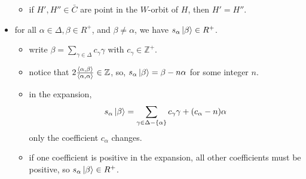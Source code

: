 \begin{itemize}
\begin{tcolorbox}[title=proof:]
\begin{itemize}
			\item if $H', H'' \in \bar{C}$ are point in the $W$-orbit of $H$, then $H' = H''$.
		\end{itemize}
	\end{tcolorbox}
	
	\item for all $\alpha \in \Delta, \beta \in R^+$, and $\beta \neq \alpha$, we have $s_\alpha \ket{\beta} \in R^+$.
	
	\begin{tcolorbox}[title=proof:]
		\begin{itemize}
			\item write $\beta = \sum_{\gamma \in \Delta} c_\gamma \gamma$ with $c_\gamma \in \mathbb{Z}^+$.
			
			\item notice that $2 \frac{\braket{\alpha, \beta}}{\braket{\alpha, \alpha}} \in \mathbb{Z}$, so, $s_\alpha \ket{\beta} = \beta - n \alpha$ for some integer $n$.
			
			\item in the expansion,
			\begin{equation}
				s_\alpha \ket{\beta} = \sum_{\gamma \in \Delta - \{\alpha\}} c_\gamma \gamma + (c_\alpha - n) \alpha
			\end{equation}
			only the coefficient $c_\alpha$ changes.
			
			\item if one coefficient is positive in the expansion, all other coefficients must be positive, so $s_\alpha \ket{\beta} \in R^+$.
		\end{itemize}
	\end{tcolorbox}
\end{itemize}

